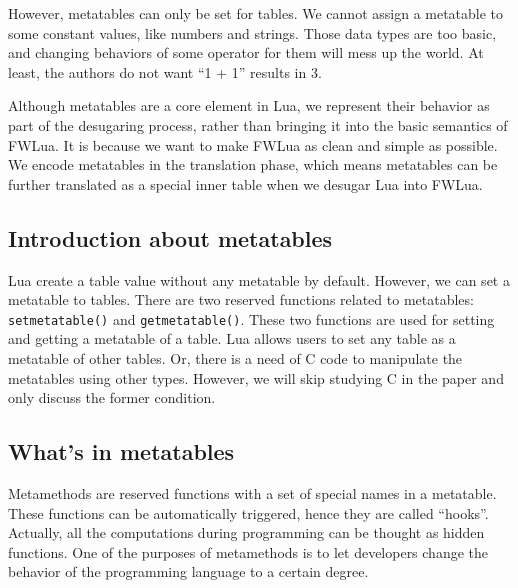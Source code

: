 However, metatables can only be set for tables. We cannot assign a metatable to some constant values, like numbers and strings. Those data types are too basic, and changing behaviors of some operator for them will mess up the world. At least, the authors do not want ``1 + 1'' results in 3. 

Although metatables are a core element in Lua, we represent their behavior as part of the desugaring process, rather than bringing it into the basic semantics of FWLua.
It is because we want to make FWLua as clean and simple as possible.
We encode metatables in the translation phase, which means metatables can be further translated as a special inner table when we desugar Lua into FWLua.

\subsection{Introduction about metatables}
Lua create a table value without any metatable by default.
However, we can set a metatable to tables.
There are two reserved functions related to metatables: {\tt setmetatable()} and {\tt getmetatable()}. These two functions are used for setting and getting a metatable of a table. %
Lua allows users to set any table as a metatable of other tables. Or, there is a need of C code to manipulate the metatables using other types. However, we will skip studying C in the paper and only discuss the former condition.

\subsection{What's in metatables}
Metamethods are reserved functions with a set of special names in a metatable. These functions can be automatically triggered, hence they are called ``hooks''. Actually, all the computations during programming can be thought as hidden functions. One of the purposes of metamethods is to let developers change the behavior of the programming language to a certain degree.

